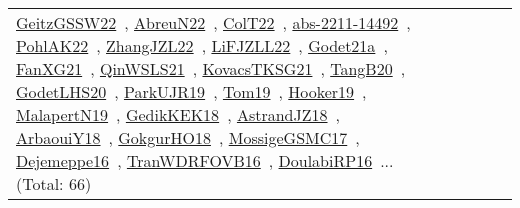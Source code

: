 {\begin{longtable}{lp{3cm}>{\raggedright\arraybackslash}p{6cm}>{\raggedright\arraybackslash}p{6cm}>{\raggedright\arraybackslash}p{8cm}}
\href{works/GeitzGSSW22.pdf}{GeitzGSSW22}~\cite{GeitzGSSW22}, \href{works/AbreuN22.pdf}{AbreuN22}~\cite{AbreuN22}, \href{works/ColT22.pdf}{ColT22}~\cite{ColT22}, \href{works/abs-2211-14492.pdf}{abs-2211-14492}~\cite{abs-2211-14492}, \href{works/PohlAK22.pdf}{PohlAK22}~\cite{PohlAK22}, \href{works/ZhangJZL22.pdf}{ZhangJZL22}~\cite{ZhangJZL22}, \href{works/LiFJZLL22.pdf}{LiFJZLL22}~\cite{LiFJZLL22}, \href{works/Godet21a.pdf}{Godet21a}~\cite{Godet21a}, \href{works/FanXG21.pdf}{FanXG21}~\cite{FanXG21}, \href{works/QinWSLS21.pdf}{QinWSLS21}~\cite{QinWSLS21}, \href{works/KovacsTKSG21.pdf}{KovacsTKSG21}~\cite{KovacsTKSG21}, \href{works/TangB20.pdf}{TangB20}~\cite{TangB20}, \href{works/GodetLHS20.pdf}{GodetLHS20}~\cite{GodetLHS20}, \href{works/ParkUJR19.pdf}{ParkUJR19}~\cite{ParkUJR19}, \href{works/Tom19.pdf}{Tom19}~\cite{Tom19}, \href{works/Hooker19.pdf}{Hooker19}~\cite{Hooker19}, \href{works/MalapertN19.pdf}{MalapertN19}~\cite{MalapertN19}, \href{works/GedikKEK18.pdf}{GedikKEK18}~\cite{GedikKEK18}, \href{works/AstrandJZ18.pdf}{AstrandJZ18}~\cite{AstrandJZ18}, \href{works/ArbaouiY18.pdf}{ArbaouiY18}~\cite{ArbaouiY18}, \href{works/GokgurHO18.pdf}{GokgurHO18}~\cite{GokgurHO18}, \href{works/MossigeGSMC17.pdf}{MossigeGSMC17}~\cite{MossigeGSMC17}, \href{works/Dejemeppe16.pdf}{Dejemeppe16}~\cite{Dejemeppe16}, \href{works/TranWDRFOVB16.pdf}{TranWDRFOVB16}~\cite{TranWDRFOVB16}, \href{works/DoulabiRP16.pdf}{DoulabiRP16}~\cite{DoulabiRP16}... (Total: 66)\\
\end{longtable}
}

